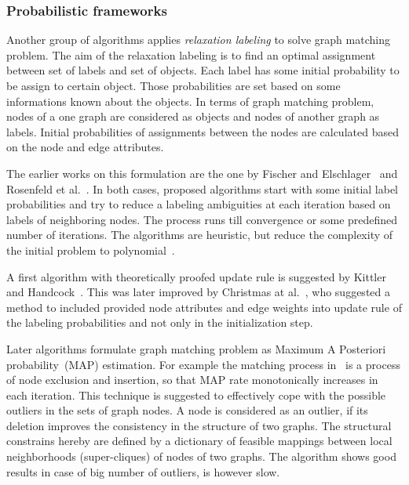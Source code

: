 \subsubsection{Probabilistic frameworks}
Another group of algorithms applies \emph{relaxation labeling} to solve graph matching problem. The aim of the relaxation labeling is to find an optimal assignment between set of labels and set of objects. Each label has some initial probability to be assign to certain object. Those probabilities are set based on some informations known about the objects. In terms of graph matching problem, nodes of a one graph are considered as objects and nodes of another graph as labels. Initial probabilities of assignments between the nodes are calculated  based on the node and edge attributes. 

The earlier works on this formulation are the one by Fischer and Elschlager~\cite{Fischler1973} and Rosenfeld et al.~\cite{Rosenfeld1976}. In both cases, proposed algorithms start with some initial label probabilities and try to reduce a labeling ambiguities at each iteration based on labels of neighboring nodes. The process runs till convergence or some predefined number of iterations. The algorithms are heuristic, but reduce the complexity of the initial problem to polynomial~\cite{Christmas1995}.

A first algorithm with theoretically proofed update rule is suggested by Kittler and Handcock~\cite{Hancock_Kittler}. This was later improved by Christmas at al.~\cite{Christmas1995}, who suggested a method to included provided node attributes and edge weights into update rule of the labeling probabilities and not only in the initialization step.

Later algorithms formulate graph matching problem as Maximum A Posteriori probability~(MAP) estimation. For example the matching process in~\cite{Hancock_StrucMatch} is a process of node exclusion and insertion, so that MAP rate monotonically increases in each iteration. This technique is suggested to effectively cope with the possible outliers in the sets of graph nodes. A node is considered as an outlier, if its deletion improves the consistency in the structure of two graphs. The structural constrains hereby are defined by a dictionary of feasible mappings between local neighborhoods (super-cliques) of nodes of two graphs. The algorithm shows good results in case of big number of outliers, is however slow.

